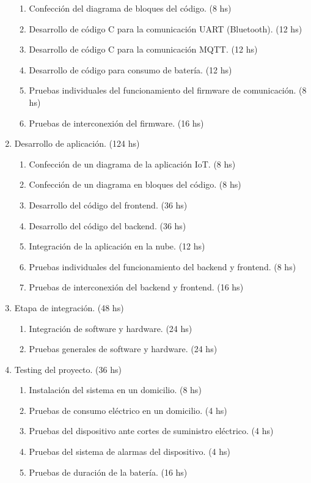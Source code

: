 \documentclass[
11pt, %
]{charter}
\begin{document}
\begin{enumerate}
\begin{enumerate}
	\item Confección del diagrama de bloques del código. (8 hs)
	\item Desarrollo de código C para la comunicación UART (Bluetooth). (12 hs)
	\item Desarrollo de código C para la comunicación MQTT.	(12 hs)
	\item Desarrollo de código para consumo de batería.	(12 hs)
	\item Pruebas individuales del funcionamiento del firmware de comunicación. (8 hs)
	\item Pruebas de interconexión del firmware. (16 hs)
	\end{enumerate}
\item Desarrollo de aplicación. (124 hs)
	\begin{enumerate}
	\item Confección de un diagrama de la aplicación IoT. (8 hs)
	\item Confección de un diagrama en bloques del código. (8 hs)
	\item Desarrollo del código del frontend. (36 hs)
	\item Desarrollo del código del backend. (36 hs)
	\item Integración de la aplicación en la nube. (12 hs)
	\item Pruebas individuales del funcionamiento del backend y frontend. (8 hs)
	\item Pruebas de interconexión del backend y frontend. (16 hs)
	\end{enumerate}

\item Etapa de integración. (48 hs)
	\begin{enumerate}
	\item Integración de software y  hardware. (24 hs)
	\item Pruebas generales de software y  hardware. (24 hs)
	\end{enumerate}
	
\item Testing del proyecto. (36 hs)
	\begin{enumerate}
	\item Instalación del sistema en un domicilio. (8 hs)
	\item Pruebas de consumo eléctrico en un domicilio.	(4 hs)
	\item Pruebas del dispositivo ante cortes de suministro eléctrico.	(4 hs)
	\item Pruebas del sistema de alarmas del dispositivo. (4 hs)
	\item Pruebas de duración de la batería. (16 hs)
	\end{enumerate}
	

\end{enumerate}
\end{document}
